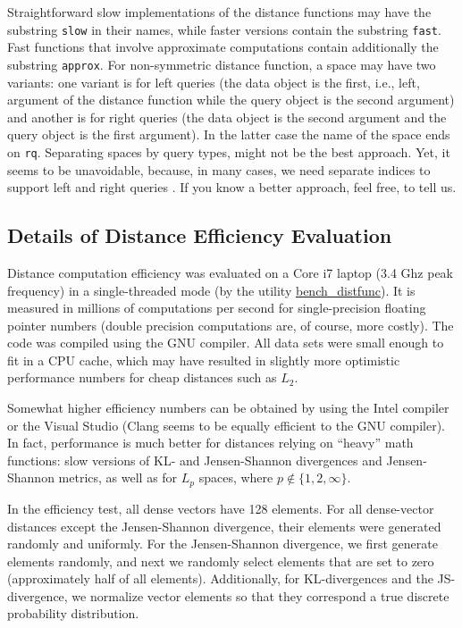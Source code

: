 \documentclass[runningheads,a4paper]{llncs}
\newcommand{\replocfile}{https://github.com/searchivarius/nmslib/blob/v1.5/}
\newcommand{\ttt}[1]{\texttt{#1}}
\begin{document}
{Straightforward slow implementations of the distance functions may have the substring \ttt{slow}
in their names, while faster versions contain the substring \ttt{fast}.
Fast functions that involve approximate computations contain additionally the substring \ttt{approx}.
For non-symmetric distance function, a space may have two variants: one variant is for left
queries (the data object is the first, i.e., left, argument of the distance function 
while the query object
is the second argument) 
and another is for right queries (the data object is the second argument and the query object is the first argument).
In the latter case the name of the space ends on \ttt{rq}.
Separating spaces by query types, might not be the best approach.
Yet, it seems to be unavoidable, because, in many cases,
we need separate indices to support left and right queries \cite{Cayton2008}.
If you know a better approach, feel free, to tell us.

\subsection{Details of Distance Efficiency Evaluation}\label{SectionDistEvalDetails}
Distance computation efficiency was evaluated on a Core i7 laptop (3.4 Ghz peak frequency)
in a single-threaded mode (by the utility \href{\replocfile similarity_search/test/bench_distfunc.cc}{bench\_distfunc}).
It is measured in millions of computations per second for single-precision
floating pointer numbers (double precision computations are, of course, more costly). 
The code was compiled using the GNU compiler. 
All data sets were small enough to fit in a CPU cache, which may have resulted in slightly more optimistic
performance numbers for cheap distances such as $L_2$.

Somewhat higher efficiency numbers can be obtained by using the Intel compiler
or the Visual Studio (Clang seems to be equally efficient to the GNU compiler).
In fact, performance is much better for distances relying on ``heavy'' math functions:
slow versions of KL- and Jensen-Shannon divergences and Jensen-Shannon metrics, 
as well as for $L_p$ spaces,
where $p \not\in\{1,2,\infty\}$.

In the efficiency test, all dense vectors have 128 elements.
For all dense-vector distances except the Jensen-Shannon divergence,
their elements were generated randomly and uniformly.
For the Jensen-Shannon divergence, we first generate elements randomly,
and next we randomly select elements that are set to zero (approximately half of all elements). 
Additionally, for KL-divergences and the JS-divergence,
we normalize vector elements so that they correspond a true discrete probability distribution. 

}
\end{document}
